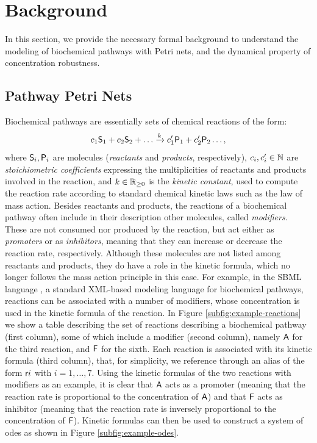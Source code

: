 \section{Background}\label{sect:background}
In this section, we provide the necessary formal background to understand the modeling of biochemical pathways with Petri nets, and the dynamical property of concentration robustness.

\subsection{Pathway Petri Nets}\label{sec:ppn}
Biochemical pathways are essentially sets of chemical reactions of the form:
\[
c_1 \mathsf{S}_1 + c_2 \mathsf{S}_2 + \ldots
\xrightarrow{k}
c_1' \mathsf{P}_1 + c_2' \mathsf{P}_2 \ldots,
\]
where $\mathsf{S}_i,\mathsf{P}_i$ are molecules (\emph{reactants} and \emph{products}, respectively), $c_i, c_i' \in \mathbb{N}$ are \emph{stoichiometric coefficients} expressing the multiplicities of reactants and products involved in the reaction, and $k \in \mathbb{R}_{\geq 0}$ is the \emph{kinetic constant}, used to compute the reaction rate according to standard chemical kinetic laws such as the law of mass action. Besides reactants and products, the reactions of a biochemical pathway often include in their description other molecules, called \emph{modifiers}. These are not consumed nor produced by the reaction, but act either as \emph{promoters} or as \emph{inhibitors}, meaning that they can increase or decrease the reaction rate, respectively. Although these molecules are not listed among reactants and products, they do have a role in the kinetic formula, which no longer follows the mass action principle in this case. For example, in the SBML language \citep{hucka2018sbml}, a standard XML-based modeling language for biochemical pathways, reactions can be associated with a number of modifiers, whose concentration is used in the kinetic formula of the reaction. In Figure \ref{subfig:example-reactions} we show a table describing the set of reactions describing a biochemical pathway (first column), some of which include a modifier (second column), namely $\mathsf{A}$ for the third reaction, and $\mathsf{F}$ for the sixth. Each reaction is associated with its kinetic formula (third column), that, for simplicity, we reference through an alias of the form $\mathsf{r}i$ with $i = 1, \ldots, 7$. Using the kinetic formulas of the two reactions with modifiers as an example, it is clear that $\mathsf{A}$ acts as a promoter (meaning that the reaction rate is proportional to the concentration of $\mathsf{A}$) and that $\mathsf{F}$ acts as inhibitor (meaning that the reaction rate is inversely proportional to the concentration of $\mathsf{F}$). Kinetic formulas can then be used to construct a system of \glspl{ode} as shown in Figure \ref{subfig:example-odes}.

